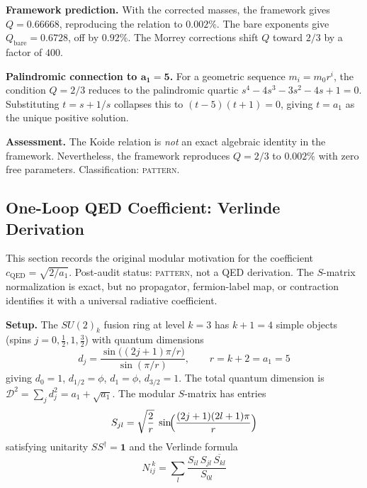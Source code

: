 \documentclass[12pt,a4paper]{article}
\theoremstyle{definition}
\begin{document}
\textbf{Framework prediction.}  With the corrected masses, the framework gives $Q = 0.66668$, reproducing the relation to $0.002\%$.  The bare exponents give $Q_{\mathrm{bare}} = 0.6728$, off by $0.92\%$.  The Morrey corrections shift $Q$ toward $2/3$ by a factor of $400$.

\textbf{Palindromic connection to $\boldsymbol{a_1 = 5}$.}  For a geometric sequence $m_i = m_0 r^i$, the condition $Q = 2/3$ reduces to the palindromic quartic $s^4 - 4s^3 - 3s^2 - 4s + 1 = 0$.  Substituting $t = s + 1/s$ collapses this to $(t-5)(t+1) = 0$, giving $t = a_1$ as the unique positive solution.

\textbf{Assessment.}  The Koide relation is \emph{not} an exact algebraic identity in the framework.  Nevertheless, the framework reproduces $Q = 2/3$ to $0.002\%$ with zero free parameters.  Classification: \textsc{pattern}.

\subsection{One-Loop QED Coefficient: Verlinde Derivation}
\label{sec:S-oneloop}

This section records the original modular motivation for the coefficient \(c_{\text{QED}}=\sqrt{2/a_1}\).  Post-audit status: \textsc{pattern}, not a QED derivation.  The \(S\)-matrix normalization is exact, but no propagator, fermion-label map, or contraction identifies it with a universal radiative coefficient.

\textbf{Setup.}  The $SU(2)_k$ fusion ring at level $k = 3$ has $k + 1 = 4$ simple objects (spins $j = 0, \tfrac{1}{2}, 1, \tfrac{3}{2}$) with quantum dimensions
\begin{equation}
d_j = \frac{\sin\bigl((2j+1)\pi/r\bigr)}{\sin(\pi/r)}, \qquad r = k + 2 = a_1 = 5
\end{equation}
giving $d_0 = 1$, $d_{1/2} = \phi$, $d_1 = \phi$, $d_{3/2} = 1$.  The total quantum dimension is $\mathcal{D}^2 = \sum_j d_j^2 = a_1 + \sqrt{a_1}$.  The modular $S$-matrix has entries
\begin{equation}
S_{jl} = \sqrt{\frac{2}{r}}\;\sin\!\Bigl(\frac{(2j+1)(2l+1)\pi}{r}\Bigr)
\label{eq:S-Smatrix}
\end{equation}
satisfying unitarity $SS^\dagger = \mathbf{1}$ and the Verlinde formula
\begin{equation}
N_{ij}^{\;k} = \sum_l \frac{S_{il}\,S_{jl}\,\overline{S_{kl}}}{S_{0l}}
\label{eq:S-verlinde}
\end{equation}
\end{document}
